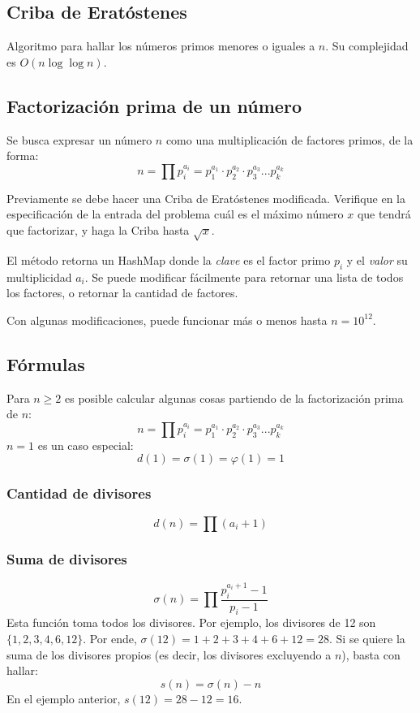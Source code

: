 \documentclass{article}
\begin{document}
\begin{multicols}{2}
	\subsection{Criba  de Eratóstenes}
	Algoritmo para hallar los números primos menores o iguales a \( n \). Su complejidad es \( O(n \log \log n) \).
	
	
	\subsection{Factorización prima de un número}
	Se busca expresar un número \( n \) como una multiplicación de factores primos, de la forma:
	\[ n = \prod p_{i}^{a_{i}} = p_{1}^{a_{1}} \cdot p_{2}^{a_{2}} \cdot p_{3}^{a_{3}} ...  p_{k}^{a_{k}} \]
	
	Previamente se debe hacer una Criba de Eratóstenes modificada. Verifique en la especificación de la entrada del problema cuál es el máximo número \( x \) que tendrá que factorizar, y haga la Criba hasta \( \sqrt{x} \).
	
	El método retorna un HashMap donde la \emph{clave} es el factor primo \( p_{i} \) y el \emph{valor} su multiplicidad \( a_{i} \). Se puede modificar fácilmente para retornar una lista de todos los factores, o retornar la cantidad de factores.
	
	Con algunas modificaciones, puede funcionar más o menos hasta \( n = 10^{12} \).
	
	
	\subsection{Fórmulas}
	Para \( n \geq 2 \) es posible calcular algunas cosas partiendo de la factorización prima de \( n \):
	\[ n = \prod p_{i}^{a_{i}} = p_{1}^{a_{1}} \cdot p_{2}^{a_{2}} \cdot p_{3}^{a_{3}} ...  p_{k}^{a_{k}} \]
	\( n = 1 \) es un caso especial:
	\[ d(1) = \sigma (1) = \varphi (1) = 1 \]

		\subsubsection{Cantidad de divisores}
		\[ d(n) = \prod (a_{i} + 1) \]
		
		\subsubsection{Suma de divisores}
		\[ 
			\sigma (n) = \prod \frac{p_{i}^{a_{i} + 1} - 1}{p_{i} - 1}
		\]
		Esta función toma todos los divisores. Por ejemplo, los divisores de 12 son \( \{1, 2, 3, 4, 6, 12\} \). Por ende, \( \sigma(12) = 1+2+3+4+6+12 = 28 \). Si se quiere la suma de los divisores propios (es decir, los divisores excluyendo a \( n \)), basta con hallar:
		\[ 
			s (n) = \sigma (n) - n
		\]		
		En el ejemplo anterior, \( s (12) = 28-12 = 16 \).
		

\end{multicols}
\end{document}
